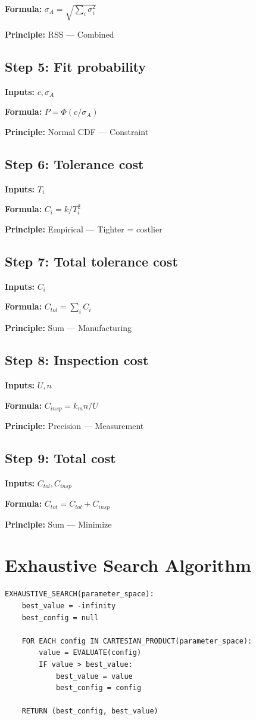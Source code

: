 \documentclass[11pt,twocolumn]{article}
\begin{document}
\textbf{Formula:} $\sigma_A = \sqrt{\sum_i \sigma_i^2}$

\textbf{Principle:} RSS --- Combined

\subsection*{Step 5: Fit probability}
\textbf{Inputs:} $c, \sigma_A$

\textbf{Formula:} $P = \Phi(c/\sigma_A)$

\textbf{Principle:} Normal CDF --- Constraint

\subsection*{Step 6: Tolerance cost}
\textbf{Inputs:} $T_i$

\textbf{Formula:} $C_i = k/T_i^2$

\textbf{Principle:} Empirical --- Tighter = costlier

\subsection*{Step 7: Total tolerance cost}
\textbf{Inputs:} $C_i$

\textbf{Formula:} $C_{tol} = \sum_i C_i$

\textbf{Principle:} Sum --- Manufacturing

\subsection*{Step 8: Inspection cost}
\textbf{Inputs:} $U, n$

\textbf{Formula:} $C_{insp} = k_m n / U$

\textbf{Principle:} Precision --- Measurement

\subsection*{Step 9: Total cost}
\textbf{Inputs:} $C_{tol}, C_{insp}$

\textbf{Formula:} $C_{tot} = C_{tol} + C_{insp}$

\textbf{Principle:} Sum --- Minimize


\section{Exhaustive Search Algorithm}

\begin{verbatim}
EXHAUSTIVE_SEARCH(parameter_space):
    best_value = -infinity
    best_config = null
    
    FOR EACH config IN CARTESIAN_PRODUCT(parameter_space):
        value = EVALUATE(config)
        IF value > best_value:
            best_value = value
            best_config = config
    
    RETURN (best_config, best_value)
\end{verbatim}
\end{document}
